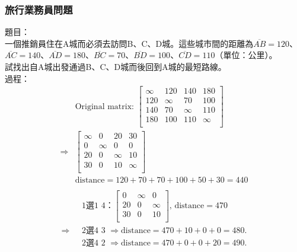 \documentclass[a4paper,12pt]{report}
\begin{document}
\subsubsection{旅行業務員問題}
題目：\\
一個推銷員住在A城而必須去訪問B、C、D城。這些城市間的距離為$\overline{AB}=120$、$\overline{AC}=140$、$\overline{AD}=180$、$\overline{BC}=70$、$\overline{BD}=100$、$\overline{CD}=110$（單位：公里）。 \\
試找出自A城出發通過B、C、D城而後回到A城的最短路線。\\
過程：\\
\[
\begin{aligned}
& \text{Original matrix: }
\begin{bmatrix}
\infty & 120 & 140 & 180 \\
120 & \infty & 70 & 100 \\
140 & 70 & \infty & 110 \\
180 & 100 & 110 & \infty \\
\end{bmatrix} \\
\Rightarrow & 
\begin{bmatrix}
\infty & 0 & 20 & 30 \\
0 & \infty & 0 & 0 \\
20 & 0 & \infty & 10 \\
30 & 0 & 10 & \infty \\
\end{bmatrix} \\
& \text{distance}=120+70+70+100+50+30=440 \\
\end{aligned}
\]
\[
\begin{aligned}
& \text{1選1 4：}
\begin{bmatrix}
0 & \infty & 0 \\
20 & 0 & \infty \\
30 & 0 & 10 \\
\end{bmatrix}
\text{, distance}=470 \\
\Rightarrow\text{ } & \text{2選4 3 } \Rightarrow \text{distance}=470+10+0+0=480. \\
& \text{2選4 2 } \Rightarrow \text{distance}=470+0+0+20=490.
\end{aligned}
\]
\end{document}
